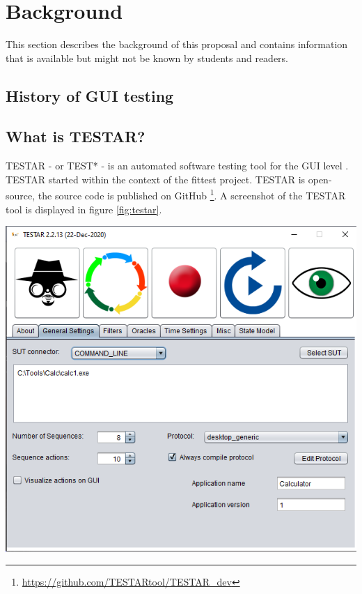 \section{Background} \label{background}
This section describes the background of this proposal and contains information that is available but might not be known by students and readers. 

\subsection{History of GUI testing}


\subsection{What is TESTAR?}
TESTAR - or TEST* - is an automated software testing tool for the GUI level \cite{testar-about}. TESTAR started within the context of the \acrfull{fittest} project. TESTAR is open-source, the source code is published on GitHub \footnote{ \url{https://github.com/TESTARtool/TESTAR\_dev}}. A screenshot of the TESTAR tool is displayed in figure \ref{fig:testar}.

\includegraphics[scale=0.5]{pics/testar.png}
\label{fig:testar}

